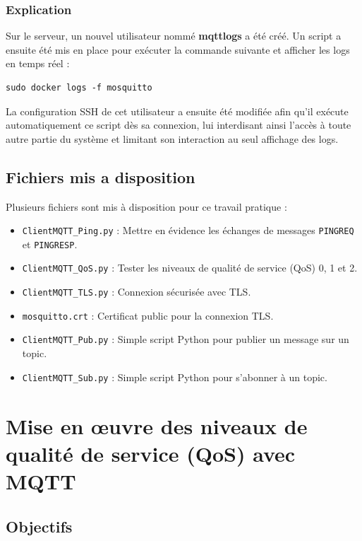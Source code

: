 \documentclass{article}
\begin{document}
\subsubsection{Explication}  
\noindent  
Sur le serveur, un nouvel utilisateur nommé \textbf{mqttlogs} a été créé. Un script a ensuite été mis en place pour exécuter la commande suivante et afficher les logs en temps réel :  

\begin{verbatim}  
sudo docker logs -f mosquitto  
\end{verbatim}  

\noindent  
La configuration SSH de cet utilisateur a ensuite été modifiée afin qu'il exécute automatiquement ce script dès sa connexion, lui interdisant ainsi l'accès à toute autre partie du système et limitant son interaction au seul affichage des logs.

\subsection{Fichiers mis a disposition}

Plusieurs fichiers sont mis à disposition pour ce travail pratique :

\begin{itemize}
    \item \texttt{ClientMQTT\_Ping.py} : Mettre en évidence les échanges de messages \texttt{PINGREQ} et \texttt{PINGRESP}.
    \item \texttt{ClientMQTT\_QoS.py} : Tester les niveaux de qualité de service (QoS) 0, 1 et 2.
    \item \texttt{ClientMQTT\_TLS.py} : Connexion sécurisée avec TLS.
    \item \texttt{mosquitto.crt} : Certificat public pour la connexion TLS.
    \item \texttt{ClientMQTT\_Pub.py} : Simple script Python pour publier un message sur un topic.
    \item \texttt{ClientMQTT\_Sub.py} : Simple script Python pour s'abonner à un topic.
\end{itemize}


\section{Mise en œuvre des niveaux de qualité de service (QoS) avec MQTT}

\subsection{Objectifs}
\end{document}
